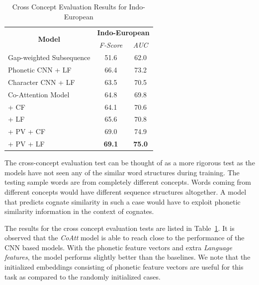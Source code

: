 \documentclass[11pt,letterpaper]{article}
\begin{document}
\begin{table}[htpb]
\centering
\begin{tabular}{|l|cc|}
\hline
\multicolumn{1}{|c|}{\multirow{2}{*}{\textbf{Model}}} & \multicolumn{2}{c|}{\textbf{Indo-European}} \\ \cline{2-3} 
\multicolumn{1}{|c|}{}                                & \textit{F-Score}      & \textit{AUC}    \\ \hline
Gap-weighted Subsequence              & 51.6                  & 62.0            \\
Phonetic CNN + LF                     & 66.4                  & 73.2            \\
Character CNN + LF                    & 63.5                  & 70.5            \\ \hline
Co-Attention Model                    & 64.8                  & 69.8            \\
\quad + CF                            & 64.1                  & 70.6            \\
\quad + LF                            & 65.6                  & 70.8            \\
\quad + PV + CF                       & 69.0                  & 74.9            \\
\quad + PV + LF                       & \textbf{69.1}                  & \textbf{75.0} \\ \hline
\end{tabular}
\caption{Cross Concept Evaluation Results for Indo-European }
\label{CC_res}
\end{table}

The cross-concept evaluation test can be thought of as a more rigorous test as the models have not seen any of the similar word structures during training. The testing sample words are from completely different concepts. Words coming from different concepts would have different sequence structures altogether. A model that predicts cognate similarity in such a case would have to exploit phonetic similarity information in the context of cognates. 

The results for the cross concept evaluation tests are listed in Table~\ref{CC_res}. It is observed that the \textit{CoAtt} model is able to reach close to the performance of the CNN based models. With the phonetic feature vectors and extra \textit{Language features}, the model performs slightly better than the baselines. We note that the initialized embeddings consisting of phonetic feature vectors are useful for this task as compared to the randomly initialized cases. 
\end{document}
